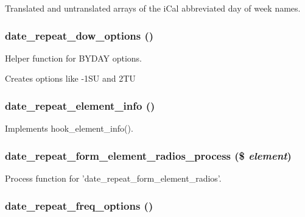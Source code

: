 Translated and untranslated arrays of the iCal abbreviated day of week names. \hypertarget{date__repeat_8module_a0db2cd4cff89bce5add79b4e73a10535}{
\subsubsection[{date\_\-repeat\_\-dow\_\-options}]{\setlength{\rightskip}{0pt plus 5cm}date\_\-repeat\_\-dow\_\-options ()}}
\label{date__repeat_8module_a0db2cd4cff89bce5add79b4e73a10535}
Helper function for BYDAY options.

Creates options like -\/1SU and 2TU \hypertarget{date__repeat_8module_ac3359bf013cf5935d9e568b487ac998d}{
\subsubsection[{date\_\-repeat\_\-element\_\-info}]{\setlength{\rightskip}{0pt plus 5cm}date\_\-repeat\_\-element\_\-info ()}}
\label{date__repeat_8module_ac3359bf013cf5935d9e568b487ac998d}
Implements hook\_\-element\_\-info(). \hypertarget{date__repeat_8module_a8cfb8bcf609bee5a14b40fd7b6d918d1}{
\subsubsection[{date\_\-repeat\_\-form\_\-element\_\-radios\_\-process}]{\setlength{\rightskip}{0pt plus 5cm}date\_\-repeat\_\-form\_\-element\_\-radios\_\-process (\$ {\em element})}}
\label{date__repeat_8module_a8cfb8bcf609bee5a14b40fd7b6d918d1}
Process function for 'date\_\-repeat\_\-form\_\-element\_\-radios'. \hypertarget{date__repeat_8module_af608a6efa0eeb6869465857d6d88b2d6}{
\subsubsection[{date\_\-repeat\_\-freq\_\-options}]{\setlength{\rightskip}{0pt plus 5cm}date\_\-repeat\_\-freq\_\-options ()}}
